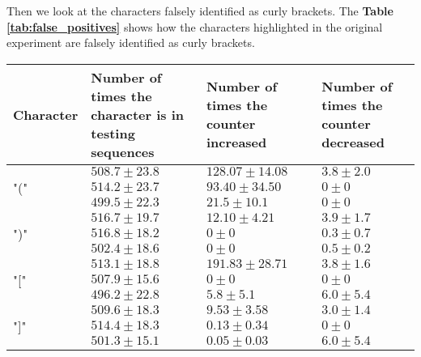 Then we look at the characters falsely identified as curly brackets. The \textbf{Table \ref{tab:false_positives}} shows how the characters highlighted in the original experiment are falsely identified as curly brackets.

\begin{table}[!ht]
    \centering
    \begin{tabular}{|C{15mm}|C{32mm}|C{32mm}|C{32mm}|}
        \hline
        Character & Number of times the character is in testing sequences & Number of times the counter increased & Number of times the counter decreased \\ \hline \hline

         & \textcolor{mygreen}{$508.7 \pm 23.8$} & \textcolor{mygreen}{$128.07 \pm 14.08$} & \textcolor{mygreen}{$3.8 \pm 2.0$} \\
        & \textcolor{mygreen2}{$514.2 \pm 23.7$} & \textcolor{mygreen2}{$93.40 \pm 34.50$} & \textcolor{mygreen2}{$0 \pm 0$} \\
        & $499.5 \pm 22.3$ & $21.5 \pm 10.1$ & $0 \pm 0$ \\ \hline

         & \textcolor{mygreen}{$516.7 \pm 19.7$} & \textcolor{mygreen}{$12.10 \pm 4.21$} & \textcolor{mygreen}{$3.9 \pm 1.7$} \\
        & \textcolor{mygreen2}{$516.8 \pm 18.2$} & \textcolor{mygreen2}{$0 \pm 0$} & \textcolor{mygreen2}{$0.3 \pm 0.7$}\\
        & $502.4 \pm 18.6$ & $0 \pm 0$ &  $0.5 \pm 0.2$ \\ \hline

        \multirow{3}{*}{"["} & \textcolor{mygreen}{$513.1 \pm 18.8$} & \textcolor{mygreen}{$191.83 \pm 28.71$} & \textcolor{mygreen}{$3.8 \pm 1.6$} \\
        & \textcolor{mygreen2}{$507.9 \pm 15.6$} & \textcolor{mygreen2}{$0 \pm 0$} & \textcolor{mygreen2}{$0 \pm 0$}\\
        & $496.2 \pm 22.8$ & $5.8 \pm 5.1$ & $6.0 \pm 5.4$ \\ \hline

        \multirow{3}{*}{"]"} & \textcolor{mygreen}{$509.6 \pm 18.3$} & \textcolor{mygreen}{$9.53 \pm 3.58$} & \textcolor{mygreen}{$3.0 \pm 1.4$}\\
        & \textcolor{mygreen2}{$514.4 \pm 18.3$} & \textcolor{mygreen2}{$0.13 \pm 0.34$} & \textcolor{mygreen2}{$0 \pm 0$}\\
        & $501.3 \pm 15.1$ & $0.05 \pm 0.03$ & $6.0 \pm 5.4$ \\ \hline


\end{tabular}
\end{table}
